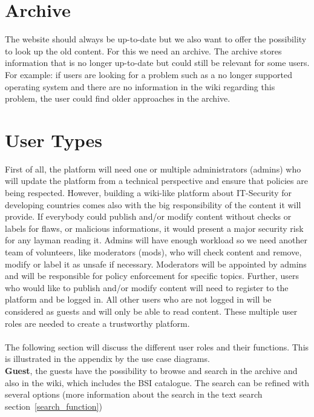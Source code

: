 \section{Archive}
\label{archive}
The website should always be up-to-date but we also want to offer the possibility to look up the old content.
For this we need an archive.
The archive stores information  that is no longer up-to-date but could still be relevant for some users. 
For example: if users are looking for a problem such as a no longer supported operating system and there are no information in the wiki regarding this problem, the user could find older approaches in the archive. 

\section{User Types} 
\label{user_types}
First of all, the platform will need one or multiple administrators (admins) who will update the platform from a technical perspective and ensure that policies are being respected. 
However, building a wiki-like platform about IT-Security for developing countries comes also with the big responsibility of the content it will provide. 
If everybody could publish and/or modify content without checks or labels for flaws, or malicious informations, it would present a major security risk for any layman reading it. 
Admins will have enough workload so we need another team of volunteers, like moderators (mods), who will check content and remove, modify or label it as unsafe if necessary. 
Moderators will be appointed by admins and will be responsible for policy enforcement for specific topics. 
Further, users who would like to publish and/or modify content will need to register to the platform and be logged in. 
All other users who are not logged in will be considered as guests and will only be able to read content. 
These multiple user roles are needed to create a trustworthy platform. 
\\\\
The following section will discuss the different user roles and their functions. 
This is illustrated in the appendix by the use case diagrams. 
\\
\textbf{Guest}, the guests have the possibility to browse and search in the archive and also in the wiki, which includes the BSI catalogue. The search can be refined with several options (more information about the search in the text search section~\ref{search_function}) 
